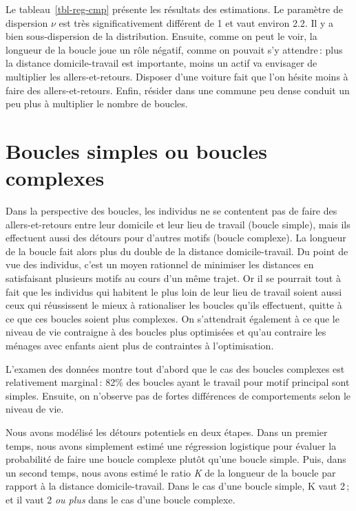 \documentclass[
  9pt,
  a4paper,
  DIV=11]{scrreprt}
\begin{document}
Le tableau~\ref{tbl-reg-cmp} présente les résultats des estimations. Le
paramètre de dispersion \(\nu\) est très significativement différent de
1 et vaut environ 2.2. Il y a bien sous-dispersion de la distribution.
Ensuite, comme on peut le voir, la longueur de la boucle joue un rôle
négatif, comme on pouvait s'y attendre\,: plus la distance
domicile-travail est importante, moins un actif va envisager de
multiplier les allers-et-retours. Disposer d'une voiture fait que l'on
hésite moins à faire des allers-et-retours. Enfin, résider dans une
commune peu dense conduit un peu plus à multiplier le nombre de boucles.

\section{Boucles simples ou boucles
complexes}\label{boucles-simples-ou-boucles-complexes}

Dans la perspective des boucles, les individus ne se contentent pas de
faire des allers-et-retours entre leur domicile et leur lieu de travail
(boucle simple), mais ils effectuent aussi des détours pour d'autres
motifs (boucle complexe). La longueur de la boucle fait alors plus du
double de la distance domicile-travail. Du point de vue des individus,
c'est un moyen rationnel de minimiser les distances en satisfaisant
plusieurs motifs au cours d'un même trajet. Or il se pourrait tout à
fait que les individus qui habitent le plus loin de leur lieu de travail
soient aussi ceux qui réussissent le mieux à rationaliser les boucles
qu'ils effectuent, quitte à ce que ces boucles soient plus complexes. On
s'attendrait également à ce que le niveau de vie contraigne à des
boucles plus optimisées et qu'au contraire les ménages avec enfants
aient plus de contraintes à l'optimisation.

L'examen des données montre tout d'abord que le cas des boucles
complexes est relativement marginal\,: 82\% des boucles ayant le travail
pour motif principal sont simples. Ensuite, on n'observe pas de fortes
différences de comportements selon le niveau de vie.

Nous avons modélisé les détours potentiels en deux étapes. Dans un
premier temps, nous avons simplement estimé une régression logistique
pour évaluer la probabilité de faire une boucle complexe plutôt qu'une
boucle simple. Puis, dans un second temps, nous avons estimé le ratio
\emph{K} de la longueur de la boucle par rapport à la distance
domicile-travail. Dans le cas d'une boucle simple, K vaut 2\,; et il
vaut 2 \emph{ou plus} dans le cas d'une boucle complexe.
\end{document}
